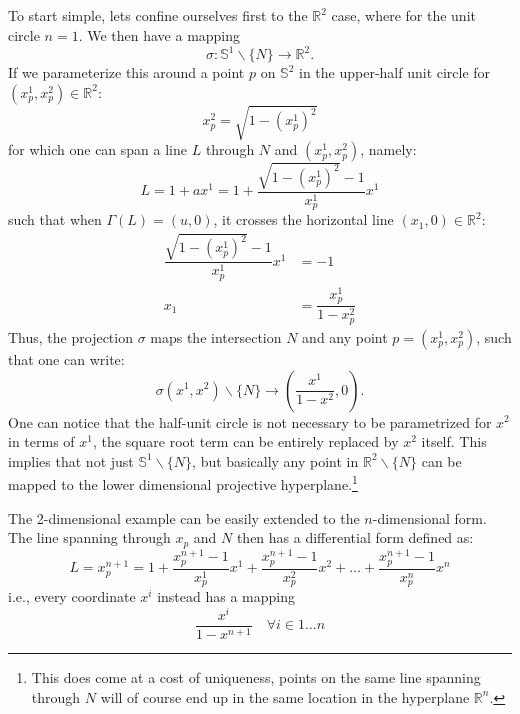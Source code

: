 \subsection{}
\subsubsection{}
To start simple, lets confine ourselves first to the $\mathbb{R}^2$ case, where for the unit circle $n=1$. We then have a mapping
\[
\sigma : \mathbb{S}^1 \backslash \{N\} \rightarrow \mathbb{R}^2. 
\]
If we parameterize this around a point $p$ on $\mathbb{S}^2$ in the upper-half unit circle for $(x_p^1,x_p^2)\in \mathbb{R}^2$:
\[
x_p^2 = \sqrt{1-(x_p^1)^2}
\]
for which one can span a line $L$ through $N$ and $(x_p^1,x_p^2)$, namely:
\[
	L = 1 + ax^1 = 1 + \dfrac{\sqrt{1-(x_p^1)^2}-1}{x_p^1}x^1
\]
such that when $\Gamma(L)=(u, 0)$, it crosses the horizontal line $(x_1, 0) \in \mathbb{R}^2$:
\[
\begin{split}
	\dfrac{\sqrt{1-(x_p^1)^2}-1}{x_p^1}x^1 &= -1 \\
	x_1 &= \dfrac{x_p^1}{1-x_p^2}
\end{split}
\]
Thus, the projection $\sigma$ maps the intersection $N$ and any point $p = (x_p^1, x_p^2)$, such that one can write: 
\[
\sigma(x^1, x^2) \backslash \{N\} \rightarrow \left(\dfrac{x^1}{1-x^2}, 0\right).
\]
One can notice that the half-unit circle is not necessary to be parametrized for $x^2$ in terms of $x^1$, the square root term can be entirely replaced by $x^2$ itself. This  implies that not just $\mathbb{S}^1\backslash \{N\} $, but basically any point in $\mathbb{R}^2\backslash \{N\} $ can be mapped to the lower dimensional projective hyperplane.\footnote{This does come at a cost of uniqueness, points on the same line spanning through $N$ will of course end up in the same location in the hyperplane $\mathbb{R}^n$.}

The 2-dimensional example can be easily extended to the $n$-dimensional form. The line spanning through $x_p$ and $N$ then has a differential form defined as:
\[
L = x_p^{n+1} = 1 + \dfrac{x_p^{n+1} - 1}{x_p^1} x^1 + \dfrac{x_p^{n+1} - 1}{x_p^2} x^2 + \dots + \dfrac{x_p^{n+1} - 1}{x_p^{n}} x^{n}
\]
i.e., every coordinate $x^i$ instead has a mapping 
\[
\dfrac{x^i}{1-x^{n+1}} \quad \forall i \in 1\dots n
\]

